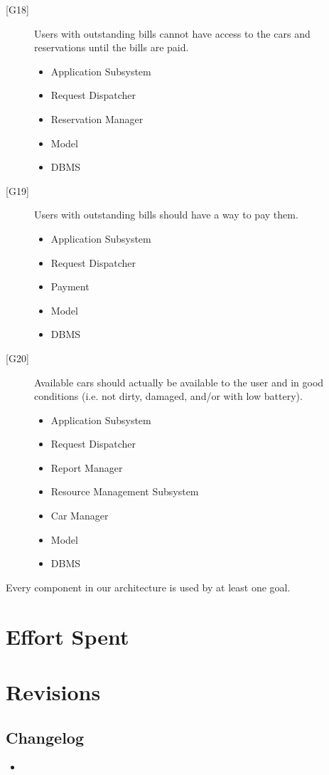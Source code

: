 \documentclass[english]{article}
\begin{document}
\begin{description}
\begin{itemize}
	\end{itemize}
	\item[{[G18]}]{Users with outstanding bills cannot have access to the cars and reservations until the bills are paid.}
	\begin{itemize}
		\item{Application Subsystem}
		\item{Request Dispatcher}
		\item{Reservation Manager}
		\item{Model}
		\item{DBMS}
	\end{itemize}
	\item[{[G19]}]{Users with outstanding bills should have a way to pay them.}
	\begin{itemize}
		\item{Application Subsystem}
		\item{Request Dispatcher}
		\item{Payment}
		\item{Model}
		\item{DBMS}
	\end{itemize}
	\item[{[G20]}]{Available cars should actually be available to the user and in good conditions (i.e. not dirty, damaged, and/or with low battery).}
	\begin{itemize}
		\item{Application Subsystem}
		\item{Request Dispatcher}
		\item{Report Manager}
		\item{Resource Management Subsystem}
		\item{Car Manager}
		\item{Model}
		\item{DBMS}
	\end{itemize}
	
\end{description}

Every component in our architecture is used by at least one goal.

\newpage

\section{Effort Spent}

\newpage

\section{Revisions}

\subsection{Changelog}
\begin{itemize}
  \item{}
\end{itemize}
\end{document}
